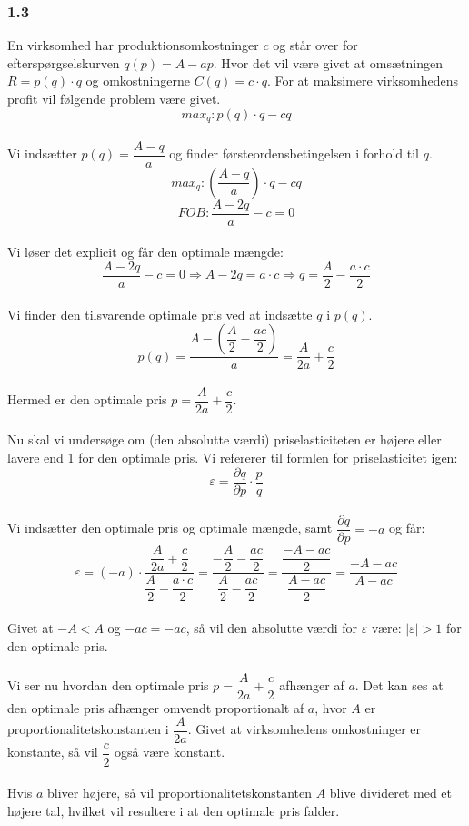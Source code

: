 \documentclass[a4paper, 12pt]{article}
\begin{document}
\subsubsection*{1.3 }
En virksomhed har produktionsomkostninger $c$ og står over for efterspørgselskurven $q(p)=A-ap$. Hvor det vil være givet at omsætningen $R = p(q) \cdot q$ og omkostningerne $C(q) = c \cdot q$.  For at maksimere virksomhedens profit vil følgende problem være givet.
$$max_{q}: p(q)\cdot q - cq$$
\\
Vi indsætter $p(q) = \dfrac{A-q}{a}$ og finder førsteordensbetingelsen i forhold til $q$.
$$max_{q}: \left( \dfrac{A-q}{a} \right) \cdot q - cq$$
$$FOB:  \dfrac{A-2q}{a} - c = 0$$
\\
Vi løser det explicit og får den optimale mængde:
$$\dfrac{A-2q}{a} - c = 0 \Rightarrow A - 2q = a\cdot c \Rightarrow q = \dfrac{A}{2} - \dfrac{a\cdot c}{2}$$
\\
Vi finder den tilsvarende optimale pris ved at indsætte $q$ i $p(q)$.
$$p(q)= \dfrac{A-\left( \dfrac{A}{2} - \dfrac{ac}{2} \right)}{a} = \dfrac{A}{2a} + \dfrac{c}{2}$$
\\
Hermed er den optimale pris $p = \dfrac{A}{2a} + \dfrac{c}{2} $.
\\\\
Nu skal vi undersøge om (den absolutte værdi) priselasticiteten er højere eller lavere end 1 for den optimale pris. Vi refererer til formlen for priselasticitet igen:
$$\varepsilon = \dfrac{\partial q}{\partial p} \cdot \dfrac{p}{q}$$
\\
Vi indsætter den optimale pris og optimale mængde, samt $ \dfrac{\partial q}{\partial p} = -a$ og får:
$$\varepsilon = (-a) \cdot \dfrac{\dfrac{A}{2a} + \dfrac{c}{2}}{\dfrac{A}{2} - \dfrac{a\cdot c}{2}} = \dfrac{-\dfrac{A}{2}-\dfrac{ac}{2}}{\dfrac{A}{2}- \dfrac{ac}{2}} = \dfrac{\dfrac{-A-ac}{2}}{\dfrac{A-ac}{2}} = \dfrac{-A - ac}{A-ac}$$
\\
Givet at $-A < A$ og $-ac=-ac$, så vil den absolutte værdi for $\varepsilon$ være: $|\varepsilon | > 1$ for den optimale pris.
\\\\
Vi ser nu hvordan den optimale pris $p = \dfrac{A}{2a} + \dfrac{c}{2} $ afhænger af $a$.  Det kan ses at den optimale pris afhænger omvendt proportionalt af $a$, hvor $A$ er proportionalitetskonstanten i $\dfrac{A}{2a}$. Givet at virksomhedens omkostninger er konstante, så vil $\dfrac{c}{2}$ også være konstant.
\\\\
Hvis $a$ bliver højere, så vil proportionalitetskonstanten $A$ blive divideret med et højere tal, hvilket vil resultere i at den optimale pris falder.
\end{document}
